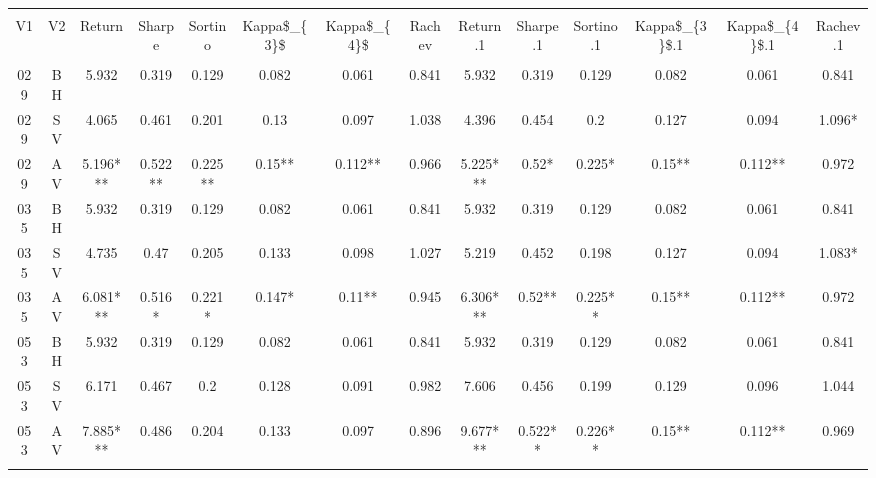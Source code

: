 
\begin{table}[!htbp] \centering 
  \caption{} 
  \label{} 
\begin{tabular}{@{\extracolsep{5pt}} cccccccccccccc} 
\\[-1.8ex]\hline 
\hline \\[-1.8ex] 
V1 & V2 & Return & Sharpe & Sortino & Kappa\$\_\{3\}\$ & Kappa\$\_\{4\}\$ & Rachev & Return.1 & Sharpe.1 & Sortino.1 & Kappa\$\_\{3\}\$.1 & Kappa\$\_\{4\}\$.1 & Rachev.1 \\ 
\hline \\[-1.8ex] 
029 & BH & 5.932 & 0.319 & 0.129 & 0.082 & 0.061 & 0.841 & 5.932 & 0.319 & 0.129 & 0.082 & 0.061 & 0.841 \\ 
029 & SV & 4.065 & 0.461 & 0.201 & 0.13 & 0.097 & 1.038 & 4.396 & 0.454 & 0.2 & 0.127 & 0.094 & 1.096* \\ 
029 & AV & 5.196*** & 0.522** & 0.225** & 0.15** & 0.112** & 0.966 & 5.225*** & 0.52* & 0.225* & 0.15** & 0.112** & 0.972 \\ 
035 & BH & 5.932 & 0.319 & 0.129 & 0.082 & 0.061 & 0.841 & 5.932 & 0.319 & 0.129 & 0.082 & 0.061 & 0.841 \\ 
035 & SV & 4.735 & 0.47 & 0.205 & 0.133 & 0.098 & 1.027 & 5.219 & 0.452 & 0.198 & 0.127 & 0.094 & 1.083* \\ 
035 & AV & 6.081*** & 0.516* & 0.221* & 0.147* & 0.11** & 0.945 & 6.306*** & 0.52** & 0.225** & 0.15** & 0.112** & 0.972 \\ 
053 & BH & 5.932 & 0.319 & 0.129 & 0.082 & 0.061 & 0.841 & 5.932 & 0.319 & 0.129 & 0.082 & 0.061 & 0.841 \\ 
053 & SV & 6.171 & 0.467 & 0.2 & 0.128 & 0.091 & 0.982 & 7.606 & 0.456 & 0.199 & 0.129 & 0.096 & 1.044 \\ 
053 & AV & 7.885*** & 0.486 & 0.204 & 0.133 & 0.097 & 0.896 & 9.677*** & 0.522** & 0.226** & 0.15** & 0.112** & 0.969 \\ 
\hline \\[-1.8ex] 
\end{tabular} 
\end{table} 
